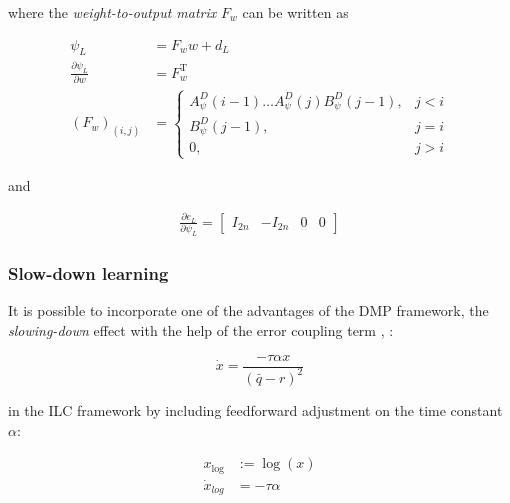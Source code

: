 \documentclass[10pt,a4paper]{article}
\newcommand{\joint}{q} %
\newcommand{\state}{\bar{\joint}} %
\newcommand{\error}{e} %
\newcommand{\traj}{r} %
\newcommand{\linDist}{d} %
\newcommand{\fullvec}{\psi} %
\newcommand{\phase}{x} %
\newcommand{\weights}{w} %
\begin{document}
where the \emph{weight-to-output matrix} $F_{\weights}$ can be written as

\begin{equation}
\begin{aligned}
\fullvec_L &= F_{\weights}\weights + \linDist_L \\
\frac{\partial{\fullvec_L}}{\partial{\weights}} &= F_{\weights}^{\mathrm{T}} \\
(F_{\weights})_{(i,j)} &= \left \{
\begin{array}{cc}
A^{D}_{\fullvec}(i-1)\ldots A^{D}_{\fullvec}(j)B^{D}_{\fullvec}(j-1), & j < i \\ 
B^{D}_{\fullvec}(j-1), & j = i \\
0, & j > i 
\end{array} \right.
\end{aligned}
\label{weightToOutputMatrix}
\end{equation}

and

\begin{equation}
\begin{aligned}
\frac{\partial{\error_L}}{\partial{\fullvec_L}} =
\begin{bmatrix}
  I_{2n} & -I_{2n} & 0 & 0
 \end{bmatrix}
\end{aligned}
\end{equation}

\subsubsection{Slow-down learning}

It is possible to incorporate one of the advantages of the DMP framework, the \emph{slowing-down} effect with the help of the error coupling term \cite{Schaal07}, \cite{Ijspeert13}:

\begin{equation}
\dot{\phase} = \frac{-\tau\alpha\phase}{(\state - \traj)^2}
\label{phaseWithErrorCoupling}
\end{equation}

in the ILC framework by including feedforward adjustment on the time constant $\alpha$:

\begin{equation}
\begin{aligned}
\phase_{\log} &:= \log(\phase) \\
\dot{\phase}_{log} &= -\tau\alpha
\label{logPhase}
\end{aligned}
\end{equation}
\end{document}

